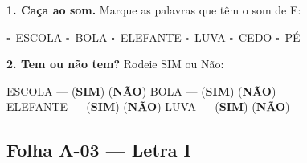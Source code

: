 \begin{somletra}[title={\faMusic~Atividade de Som da Vogal --- B\^onus (n\~ao vale nota)}]
\textbf{1. Ca\c{c}a ao som.} Marque as palavras que t\^e{}m o som de E:
\begin{center}
$\square$~ESCOLA \quad $\square$~BOLA \quad $\square$~ELEFANTE \quad $\square$~LUVA \quad $\square$~CEDO \quad $\square$~P\'E
\end{center}

\textbf{2. Tem ou n\~ao{} tem?} Rodeie SIM ou N\~ao:
\begin{center}
ESCOLA --- (\textbf{SIM}) (\textbf{N\~AO}) \quad BOLA --- (\textbf{SIM}) (\textbf{N\~AO}) \\ ELEFANTE --- (\textbf{SIM}) (\textbf{N\~AO}) \quad LUVA --- (\textbf{SIM}) (\textbf{N\~AO})
\end{center}
\end{somletra}



\subsection{Folha A-03 --- Letra I}

